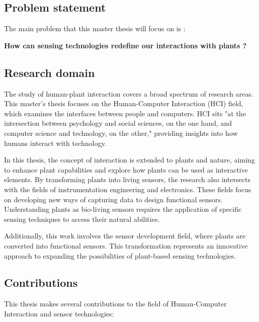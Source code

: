 \subsection{Problem statement}

The main problem that this master thesis will focus on is :

\begin{center}
    \textbf{How can sensing technologies redefine our interactions with plants ?}\\
\end{center}

\subsection{Research domain}

The study of human-plant interaction covers a broad spectrum of research areas. This master's thesis focuses on the Human-Computer Interaction (HCI) field, which examines the interfaces between people and computers. HCI sits "at the intersection between psychology and social sciences, on the one hand, and computer science and technology, on the other," \cite{carrollHUMANCOMPUTERINTERACTIONPsychology} providing insights into how humans interact with technology.

In this thesis, the concept of interaction is extended to plants and nature, aiming to enhance plant capabilities and explore how plants can be used as interactive elements. By transforming plants into living sensors, the research also intersects with the fields of instrumentation engineering and electronics. These fields focus on developing new ways of capturing data to design functional sensors. Understanding plants as bio-living sensors requires the application of specific sensing techniques to access their natural abilities.

Additionally, this work involves the sensor development field, where plants are converted into functional sensors. This transformation represents an innovative approach to expanding the possibilities of plant-based sensing technologies.


\subsection{Contributions}

This thesis makes several contributions to the field of Human-Computer Interaction and sensor technologies:

